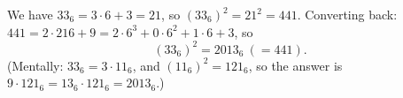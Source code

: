 We have $33_6=3\cdot6+3=21$, so $(33_6)^2=21^2=441$. Converting back: $441=2\cdot216+9=2\cdot6^3+0\cdot6^2+1\cdot6+3$, so
\[
(33_6)^2=\boxed{2013_6}\ (=441).
\]
(Mentally: $33_6=3\cdot11_6$, and $(11_6)^2=121_6$, so the answer is $9\cdot121_6=13_6\cdot121_6=2013_6$.)
